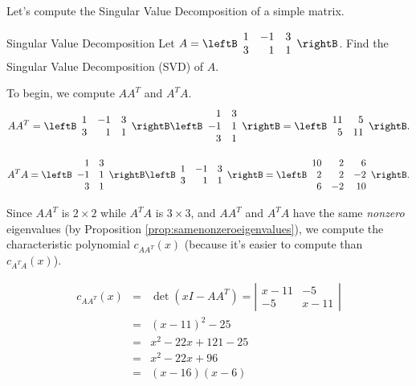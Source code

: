 Let's compute the Singular Value Decomposition of a simple matrix.

\begin{example}{Singular Value Decomposition}\label{exa:SVD}
Let 
$A=\leftB\begin{array}{rrr} 1 & -1 & 3 \\ 3 & 1 & 1 \end{array}\rightB$.
Find the Singular Value Decomposition (SVD) of $A$.
\end{example}

\begin{solution}
To begin, we compute $AA^T$ and $A^TA$.
\[ AA^T = \leftB\begin{array}{rrr} 1 & -1 & 3 \\ 3 & 1 & 1 \end{array}\rightB
\leftB\begin{array}{rr} 1 & 3 \\ -1 & 1 \\ 3 & 1  \end{array}\rightB
= \leftB\begin{array}{rr} 11 & 5 \\ 5 & 11  \end{array}\rightB.\]

\[ A^TA = \leftB\begin{array}{rr} 1 & 3 \\ -1 & 1 \\ 3 & 1  \end{array}\rightB
\leftB\begin{array}{rrr} 1 & -1 & 3 \\ 3 & 1 & 1 \end{array}\rightB
= \leftB\begin{array}{rrr} 10 & 2 & 6 \\ 2 & 2 & -2\\
6 & -2 & 10 \end{array}\rightB.\]

Since $AA^T$ is $2\times 2$ while $A^T A$ is $3\times 3$, and $AA^T$
and $A^TA$ have the same {\em nonzero} eigenvalues (by Proposition
\ref{prop:samenonzeroeigenvalues}), we compute the characteristic polynomial  $c_{AA^T}(x)$ (because it's
easier to compute than $c_{A^TA}(x)$).

\begin{eqnarray*}
c_{AA^T}(x)& = &\det(xI-AA^T)= \left|\begin{array}{cc}
x-11 & -5 \\ -5 & x-11 \end{array}\right|\\
& = &(x-11)^2 - 25 \\
& = & x^2-22x+121-25\\
& = & x^2-22x+96\\
& = & (x-16)(x-6)
\end{eqnarray*}


\end{solution}
